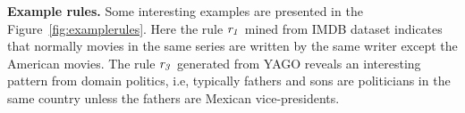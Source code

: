 \textbf{Example rules.} Some interesting examples are presented in the Figure~\ref{fig:examplerules}. Here 
the rule $\mathit{r_1}$ mined from IMDB dataset indicates that normally movies in the same series are written by the same writer except the American movies. The rule $\mathit{r_3}$ generated from YAGO reveals an interesting pattern from domain politics, i.e, typically fathers and sons are politicians in the same country unless the fathers are Mexican vice-presidents.